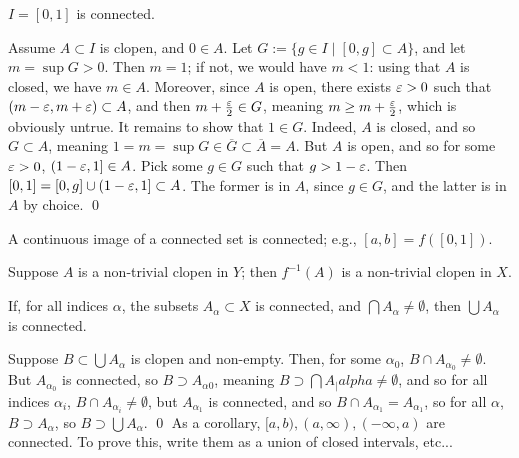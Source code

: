 \begin{simplethm}
    $I = [0, 1]$ is connected.
\end{simplethm}
\noindent Assume $A \subset I$ is clopen, and $0 \in A$. Let $G := \{g \in I \mid [0, g] \subset A\}$, and let $m = \sup G > 0$. Then $m = 1$; if not, we would have $m < 1$: using that $A$ is closed, we have $m \in A$. Moreover, since $A$ is open, there exists $\varepsilon > 0$ such that $(m - \varepsilon, m + \varepsilon) \subset A$, and then $m + \frac{\varepsilon}{2} \in G$, meaning $m \geq m + \frac{\varepsilon}{2}$, which is obviously untrue. It remains to show that $1 \in G$. Indeed, $A$ is closed, and so $G \subset A$, meaning $1 = m = \sup G \in \overline{G} \subset \overline{A} = A$. But $A$ is open, and so for some $\varepsilon > 0$, $(1 - \varepsilon, 1] \in A$. Pick some $g \in G$ such that $g > 1 - \varepsilon$. Then $[0, 1] = [0, g] \cup (1 - \varepsilon, 1] \subset A$. The former is in $A$, since $g \in G$, and the latter is in $A$ by choice. \qed
\begin{simpleclaim}
    A continuous image of a connected set is connected; e.g., $[a, b] = f([0, 1])$.
\end{simpleclaim}
\noindent Suppose $A$ is a non-trivial clopen in $Y$; then $f^{-1}(A)$ is a non-trivial clopen in $X$.
\begin{simpleclaim}
    If, for all indices $\alpha$, the subsets $A_\alpha \subset X$ is connected, and $\bigcap A_\alpha \neq \emptyset$, then $\bigcup A_\alpha$ is connected.
\end{simpleclaim}
\noindent Suppose $B \subset \bigcup A_\alpha$ is clopen and non-empty. Then, for some $\alpha_0$, $B \cap A_{\alpha_0} \neq \emptyset$. But $A_{\alpha_0}$ is connected, so $B \supset A_{\alpha{0}}$, meaning $B \supset \bigcap A_|alpha \neq \emptyset$, and so for all indices $\alpha_i$, $B \cap A_{\alpha_i} \neq \emptyset$, but $A_{\alpha_1}$ is connected, and so $B \cap A_{\alpha_1} = A_{\alpha_1}$, so for all $\alpha$, $B \supset A_\alpha$, so $B \supset \bigcup A_\alpha$. \qed
\medskip\newline
\noindent As a corollary, $[a, b), (a, \infty), (-\infty, a)$ are connected. To prove this, write them as a union of closed intervals, etc...